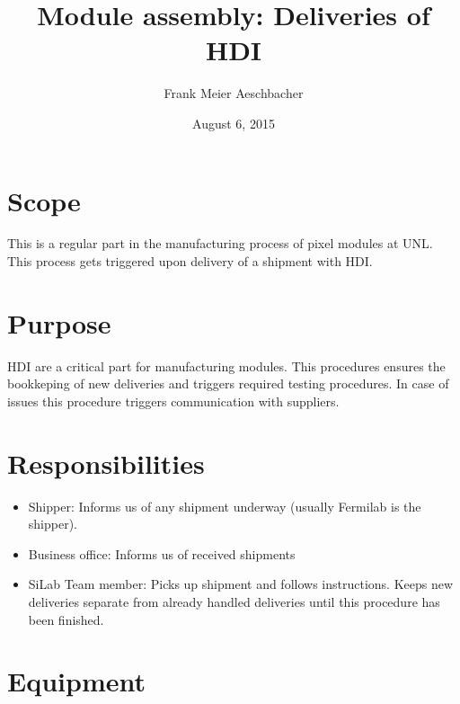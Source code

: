 \documentclass[12pt]{unlsilabsop}
\title{Module assembly: Deliveries of HDI}
\date{August 6, 2015}
\author{Frank Meier Aeschbacher}
\begin{document}
\maketitle

\section{Scope}
This is a regular part in the manufacturing process of pixel modules at UNL. This process gets triggered upon delivery of a shipment with HDI.

\section{Purpose}
HDI are a critical part for manufacturing modules. This procedures ensures the bookkeping of new deliveries and triggers required testing procedures. In case of issues this procedure triggers communication with suppliers.


\section{Responsibilities}

\begin{itemize}
    \item Shipper: Informs us of any shipment underway (usually Fermilab is the shipper).
    \item Business office: Informs us of received shipments
    \item SiLab Team member: Picks up shipment and follows instructions. Keeps new deliveries separate from already handled deliveries until this procedure has been finished.
\end{itemize}

\section{Equipment}
\end{document}
